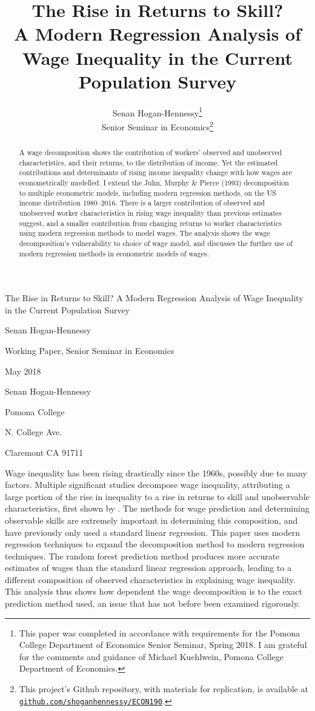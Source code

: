 \documentclass[notitlepage,12pt]{article}
\author{Senan Hogan-Hennessy\footnote{This paper was completed in accordance with requirements for the Pomona College Department of Economics Senior Seminar, Spring 2018.
I am grateful for the comments and guidance of Michael Kuehlwein, Pomona College Department of Economics.} \\
Senior Seminar in Economics\footnote{
  This project's Github repository, with materials for replication, is available at
  \href{https://github.com/shoganhennessy/Econ_text_data}{\nolinkurl{github.com/shoganhennessy/ECON190}}.}}
\title{The Rise in Returns to Skill? \\ \Large{A Modern Regression Analysis of Wage Inequality in the Current Population Survey}}
\date{\begin{singlespace} \normalsize{
\vfill Pomona College, Department of Economics \\
\noindent 425 N. College Ave.  \\
\noindent Claremont CA 91711   \\
\noindent May 2018}
\end{singlespace}}
\newcommand{\1}[1]{\ensuremath{\mathbb{1}\left( #1 \right)}}               %
\begin{document}
\maketitle
\thispagestyle{empty}

\newpage \thispagestyle{empty}
\begin{singlespace}
\noindent The Rise in Returns to Skill?  A Modern Regression Analysis of Wage Inequality in the Current Population Survey

\noindent Senan Hogan-Hennessy

\noindent Working Paper, Senior Seminar in Economics

\noindent May 2018
\end{singlespace}

\begin{abstract} \noindent
A wage decomposition shows the contribution of workers' observed and unobserved characteristics, and their
returns, to the distribution of income.  
Yet the estimated contributions and determinants of rising income inequality change with how wages are
econometrically modelled.
I extend the Juhn, Murphy \& Pierce (1993) decomposition to multiple econometric models, including 
modern regression methods, on the US income distribution 1980--2016.
There is a larger contribution of observed and unobserved worker characteristics 
in rising wage inequality than previous estimates suggest,
and a smaller contribution from changing returns to worker characteristics
using modern regression methods to model wages.
The analysis shows the wage decomposition's vulnerability to choice of wage model,
and discusses the further use of modern regression methods in econometric models of wages.
\end{abstract}
\vfill
\begin{singlespace}
\noindent Senan Hogan-Hennessy

\noindent Pomona College

 N. College Ave.

\noindent Claremont CA 91711
\end{singlespace}


\newpage
\setcounter{page}{1}
\noindent
Wage inequality has been rising drastically since the 1960s, possibly due to many factors.  Multiple significant studies decompose wage inequality, attributing a large portion of the rise in inequality to a rise in returns to skill and unobservable characteristics, first shown by \cite{juhn1993wage}.  The methods for wage prediction and determining observable skills are extremely important in determining this composition, and have previously only used a standard linear regression.  This paper uses modern regression techniques to expand the \cite{juhn1993wage} decomposition method to modern regression techniques.  The random forest prediction method produces more accurate estimates of wages than the standard linear regression approach, leading to a different composition of observed characteristics in explaining wage inequality.  This analysis thus shows how dependent the wage decomposition is to the exact prediction method used, an issue that has not before been examined rigorously. 
\end{document}
